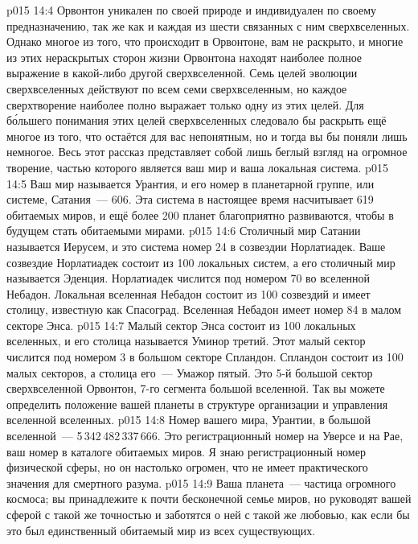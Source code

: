 \vs p015 14:4 Орвонтон уникален по своей природе и индивидуален по своему предназначению, так же как и каждая из шести связанных с ним сверхвселенных. Однако многое из того, что происходит в Орвонтоне, вам не раскрыто, и многие из этих нераскрытых сторон жизни Орвонтона находят наиболее полное выражение в какой\hyp{}либо другой сверхвселенной. Семь целей эволюции сверхвселенных действуют по всем семи сверхвселенным, но каждое сверхтворение наиболее полно выражает только одну из этих целей. Для б\'ольшего понимания этих целей сверхвселенных следовало бы раскрыть ещё многое из того, что остаётся для вас непонятным, но и тогда вы бы поняли лишь немногое. Весь этот рассказ представляет собой лишь беглый взгляд на огромное творение, частью которого является ваш мир и ваша локальная система.
\vs p015 14:5 \pc Ваш мир называется Урантия, и его номер в планетарной группе, или системе, Сатания~--- 606. Эта система в настоящее время насчитывает 619 обитаемых миров, и ещё более 200 планет благоприятно развиваются, чтобы в будущем стать обитаемыми мирами.
\vs p015 14:6 Столичный мир Сатании называется Иерусем, и это система номер 24 в созвездии Норлатиадек. Ваше созвездие Норлатиадек состоит из 100 локальных систем, а его столичный мир называется Эденция. Норлатиадек числится под номером 70 во вселенной Небадон. Локальная вселенная Небадон состоит из 100 созвездий и имеет столицу, известную как Спасоград. Вселенная Небадон имеет номер 84 в малом секторе Энса.
\vs p015 14:7 Малый сектор Энса состоит из 100 локальных вселенных, и его столица называется Уминор третий. Этот малый сектор числится под номером 3 в большом секторе Спландон. Спландон состоит из 100 малых секторов, а столица его~--- Умажор пятый. Это 5\hyp{}й большой сектор сверхвселенной Орвонтон, 7\hyp{}го сегмента большой вселенной. Так вы можете определить положение вашей планеты в структуре организации и управления вселенной вселенных.
\vs p015 14:8 Номер вашего мира, Урантии, в большой вселенной~--- 5\,342\,482\,337\,666. Это регистрационный номер на Уверсе и на Рае, ваш номер в каталоге обитаемых миров. Я знаю регистрационный номер физической сферы, но он настолько огромен, что не имеет практического значения для смертного разума.
\vs p015 14:9 \pc Ваша планета~--- частица огромного космоса; вы принадлежите к почти бесконечной семье миров, но руководят вашей сферой с такой же точностью и заботятся о ней с такой же любовью, как если бы это был единственный обитаемый мир из всех существующих.
